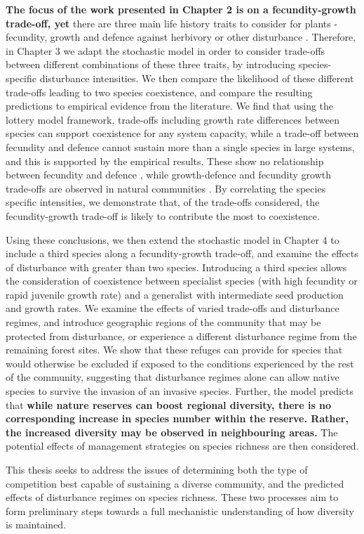 \textbf{The focus of the work presented in Chapter 2 is on a fecundity-growth trade-off, yet} there are three main life history traits to consider for plants - fecundity, growth and defence against herbivory or other disturbance \citep{bazzaz1987allocating}. Therefore, in Chapter 3 we adapt the stochastic model in order to consider trade-offs between different combinations of these three traits, by introducing species-specific disturbance intensities. We then compare the likelihood of these different trade-offs leading to two species coexistence, and compare the resulting predictions to empirical evidence from the literature. We find that using the lottery model framework, trade-offs including growth rate differences between species can support coexistence for any system capacity, while a trade-off between fecundity and defence cannot sustain more than a single species in large systems, and this is supported by the empirical results. These show no relationship between fecundity and defence \citep{martin2010divergence}, while growth-defence and fecundity growth trade-offs are observed in natural communities \citep[e.g.][]{stanton2002competition,turnbull1999seed,wright2010functional,fine2006growth}. By correlating the species specific intensities, we demonstrate that, of the trade-offs considered, the fecundity-growth trade-off is likely to contribute the most to coexistence.

Using these conclusions, we then extend the stochastic model in Chapter 4 to include a third species along a fecundity-growth trade-off, and examine the effects of disturbance with greater than two species. Introducing a third species allows the consideration of coexistence between specialist species (with high fecundity or rapid juvenile growth rate) and a generalist with intermediate seed production and growth rates. We examine the effects of varied trade-offs and disturbance regimes, and introduce geographic regions of the community that may be protected from disturbance, or experience a different disturbance regime from the remaining forest sites. We show that these refuges can provide for species that would otherwise be excluded if exposed to the conditions experienced by the rest of the community, suggesting that disturbance regimes alone can allow native species to survive the invasion of an invasive species. Further, the model predicts that \textbf{while nature reserves can boost regional diversity, there is no corresponding increase in species number within the reserve. Rather, the increased diversity may be observed in neighbouring areas.} The potential effects of management strategies on species richness are then considered.

This thesis seeks to address the issues of determining both the type of competition best capable of sustaining a diverse community, and the predicted effects of disturbance regimes on species richness. These two processes aim to form preliminary steps towards a full mechanistic understanding of how diversity is maintained.